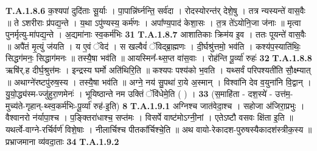 \documentclass[17pt]{extarticle}
\begin{document}
                                                                  \textbf{ T.A.1.8.6} \newline
                  क॒श्यपा॑ दुदि॑ताः सू॒र्याः । पा॒पान्नि॑र्घ्नन्ति॒ सर्व॑दा ।  रोदस्योरन्त॑र् देशे॒षु । तत्र न्यस्यन्ते॑ वास॒वैः ॥  ते ऽशरीराः प्र॑पद्य॒न्ते ।  य॒था ऽपु॑ण्यस्य॒ कर्म॑णः । अपा᳚ण्य॒पाद॑ केशा॒सः । त॒त्र ते॑ऽयोनि॒जा ज॑नाः ॥ मृत्वा पुनर्मृत्यु-मा॑पद्य॒न्ते । अ॒द्यमा॑नाः स्व॒कर्म॑भिः \textbf{ 31} \newline
                  \newline
                                                                  \textbf{ T.A.1.8.7} \newline
                  आशातिकाः क्रिम॑य इ॒व । ततः पूयन्ते॑ वास॒वैः ॥  अपै॑तं मृ॒त्युं ज॑यति । य ए॒वं ॅवेद॑ । स खल्वैवं॑ ॅविद्ब्रा॒ह्मणः । दी॒र्घश्रु॑त्तमो॒ भव॑ति । कश्य॑प॒स्याति॑थिः॒ सिद्धग॑मनः॒ सिद्धाग॑मनः ॥  तस्यै॒षा भव॑ति ॥ आयस्मिन᳚-थ्स॒प्त वा॑स॒वाः ।  रोह॑न्ति पू॒र्व्या॑ रुहः॑ \textbf{ 32} \newline
                  \newline
                                                                  \textbf{ T.A.1.8.8} \newline
                  ऋषि॑र्.ह दीर्घ॒श्रुत्त॑मः । इन्द्रस्य घर्मो अति॑थिरि॒ति ॥  कश्यपः पश्य॑को भ॒वति । यथ्सर्वं परिपश्यती॑ति सौ॒क्ष्म्यात् ॥ अथाग्ने॑रष्टपु॑रुष॒स्य । तस्यै॒षा भव॑ति ॥ अग्ने॒ नय॑ सु॒पथा॑ रा॒ये अ॒स्मान् ।  विश्वा॑नि देव व॒युना॑नि वि॒द्वान् । यु॒यो॒द्ध्य॑स्म-ज्जु॑हुरा॒णमेनः॑ । भूयिष्ठान्ते नम उक्तिं ॅवि॑धेमे॒ति ( ) । \textbf{ 33} \newline
                  \newline
                                                        (स॒माहि॑ता - दश॒स्ये॑ - उत्त॑म॒-मुच्य॑ते-गृहान्-थ्स्व॒कर्म॑भिः-पू॒र्व्या॑ रुह॑-इ॒ति) \textbf{8} \newline \newline
                                \textbf{ T.A.1.9.1} \newline
                  अग्निश्च जात॑वेदा॒श्च । सहोजा अ॑जिरा॒प्रभुः । वैश्वानरो न॑र्यापा॒श्च । प॒ङ्क्तिरा॑धाश्च॒ सप्त॑मः ।  विसर्पे वाष्ट॑मोऽग्नी॒नां । एतेऽष्टौ वसवः क्षि॑ता इ॒ति ॥ यथर्त्वे-वाग्ने-रर्चिर्वर्ण॑ विशे॒षाः ।  नीलार्चिश्च पीतका᳚र्चिश्चे॒ति ॥ अथ वायो-रेकादश-पुरुषस्यैकादश॑स्त्रीक॒स्य ॥  प्रभ्राजमाना व्य॑वदा॒ताः \textbf{ 34} \newline
                  \newline
                                                                  \textbf{ T.A.1.9.2} \newline
\end{document}
